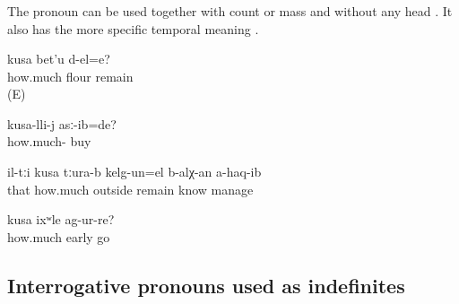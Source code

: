 \subsubsection{ }
\label{sssec:kusa how much how many}

The pronoun  can be used together with count  or mass   and without any head  . It also has the more specific temporal meaning  .
%
\begin{exe}

	\ex	\label{ex:How much flour remained?}
	\gll	kusa	bet'u	d-el=e?\\
		how.much	flour	remain\\
	\glt	{} (E)

	\ex	\label{ex:For how much did you buy it}
	\gll	kusa-lli-j	asː-ib=de?\\
		how.much-	buy\\
	\glt	{}
	
	\ex	\label{ex:No one is able to know for how long they were away}
	\gll	il-tːi	kusa	tːura-b	kelg-un=el	b-alχ-an	a-haq-ib\\
		that	how.much	outside	remain	know	manage\\
	\glt	{}

	\ex	\label{ex:How (much) early did he go}
	\gll	kusa	ixʷle	ag-ur-re?\\
		how.much	early	go\\
	\glt	{}
\end{exe}



\subsection{Interrogative pronouns used as indefinites}
\label{ssec:Interrogative pronouns as indefinites}

